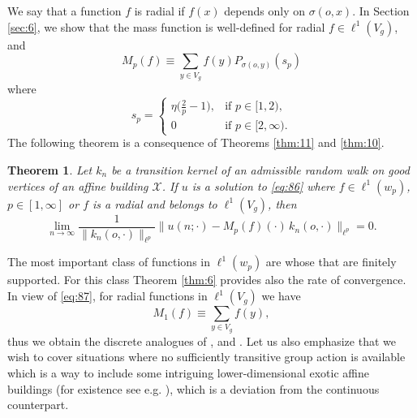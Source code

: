\documentclass[11pt]{amsart}
\newcommand{\scrX}{\mathscr{X}}
\theoremstyle{plain}
\newcounter{thm}
\newtheorem{main_theorem}[thm]{Theorem}
\theoremstyle{definition}
\numberwithin{equation}{section}
\begin{document}
We say that a function $f$ is radial if $f(x)$ depends only on $\sigma(o, x)$. In Section \ref{sec:6}, we show that the mass
function is well-defined for radial $f \in \ell^1(V_g)$, and
\begin{equation}
	\label{eq:87}
	M_p(f) \equiv \sum_{y\in V_g} f(y) P_{\sigma(o,y)}(s_p)
\end{equation}
where
\[
	s_p =
	\begin{cases}
		\eta\Big(\tfrac{2}{p} - 1 \Big), &\text{if } p \in [1, 2), \\
		0 &\text{if } p \in [2, \infty).
	\end{cases}
\]
The following theorem is a consequence of Theorems \ref{thm:11} and \ref{thm:10}. 
\begin{main_theorem}
	Let $k_n$ be a transition kernel of an admissible random walk on good vertices of an affine building $\scrX$.
	If $u$ is a solution to \eqref{eq:86} where $f \in \ell^1(w_p)$, $p \in [1, \infty]$ or $f$ is a radial and
	belongs to $\ell^1(V_g)$, then
	\[ 
		\lim_{n \to \infty} 
		\frac{1}{\|k_n(o, \cdot)\|_{\ell^p}}
		\| u(n;\cdot)-M_p(f)(\cdot)\, k_n(o,\cdot)\|_{\ell^p}=0.
	\]
\end{main_theorem}
The most important class of functions in $\ell^1(w_p)$ are whose that are finitely supported. For this class Theorem
\ref{thm:6} provides also the rate of convergence. In view of \eqref{eq:87}, for radial functions in $\ell^1(V_g)$
we have 
\[
	M_1(f) \equiv \sum_{y \in V_g} f(y),
\]
thus we obtain the discrete analogues of \cite{VazHyp}, \cite{APZ2023} and \cite{P1}. Let us also emphasize that we wish to cover 
situations where no sufficiently transitive group action is available which is a way to include some intriguing lower-dimensional 
exotic affine buildings (for existence see e.g. \cite{RonanExotic}), which is a deviation from the continuous counterpart.
\end{document}

